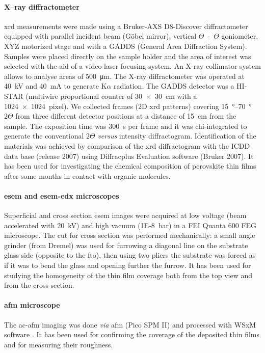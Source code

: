 		\paragraph{X--ray diffractometer}
		\gls{xrd} measurements were made using a Bruker-AXS D8-Discover diffractometer equipped with parallel incident beam (Göbel mirror), vertical $\Theta$~-~$\Theta$ goniometer, XYZ motorized stage and with a GADDS (General Area Diffraction System).
		Samples were placed directly on the sample holder and the area of interest was selected with the aid of a video-laser focusing  system.
		An X-ray collimator system allows to analyse areas of \SI{500}{\um}.
		The X-ray diffractometer was operated at \SI{40}{\kV} and \SI{40}{\mA} to generate  K$\alpha$ radiation.
		The GADDS detector was a HI-STAR (multiwire proportional counter of \SI{30x30}{\cm} with a \SI{1024x1024}{pixel}).
		We collected frames (2D \gls{xrd} patterns) covering \SIrange{15}{70}{\degree} $2\Theta$ from three different detector positions at a distance of \SI{15}{\cm} from the sample.
		The exposition time was \SI{300}{\s} per frame and it was chi-integrated to generate the conventional $2\Theta$ \textsl{versus} intensity diffractogram.
		Identification of the materials was achieved by comparison of the \gls{xrd} diffractogram with the ICDD data base (release 2007) using Diffracplus Evaluation software (Bruker 2007).
		It has been used for investigating the chemical composition of perovskite thin films after some months in contact with organic molecules.

		\paragraph{\Acrshort{esem} and \acrshort{esem}-\acrshort{edx} microscopes}
		Superficial and cross section \gls{esem} images were acquired at low voltage (beam accelerated with \SI{20}{\kV}) and high vacuum (\SI{1E-8}{\bar}) in a FEI Quanta 600 FEG microscope.
		The cut for cross section was performed mechanically: a small angle grinder (from Dremel) was used for furrowing a diagonal line on the substrate glass side (opposite to the \gls{fto}), then using two pliers the substrate was forced as if it was to bend the glass and opening further the furrow.
		It has been used for studying the homogeneity of the thin film coverage both from the top view and from the cross section.

		\paragraph{\Acrshort{afm} microscope}
		The \acrfull{ac-afm} imaging was done \textsl{via} \gls{afm} (Pico SPM II) and processed with WSxM software \cite{Horcas2007}.
		It has been used for confirming the coverage of the deposited thin films and for measuring their roughness.

